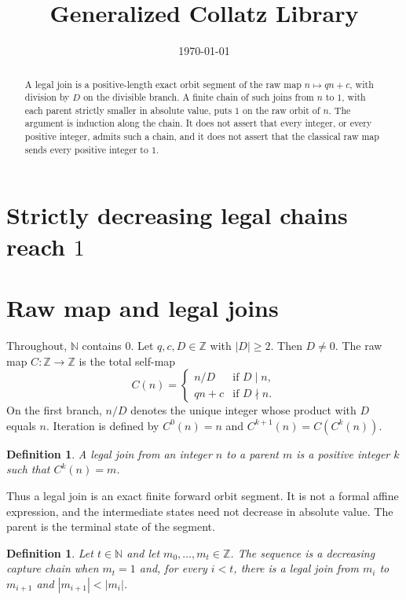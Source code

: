 \documentclass[11pt,letterpaper]{article}
\title{Generalized Collatz Library}
\author{}
\date{\today}
\newcommand{\N}{\mathbb{N}}
\newcommand{\Z}{\mathbb{Z}}
\newcommand{\Map}[3]{#1 \colon #2 \to #3}
\newtheorem{definition}[theorem]{Definition}
\begin{document}
\maketitle
\section*{Strictly decreasing legal chains reach \(1\)}

\begin{abstract}
A legal join is a positive-length exact orbit segment of the raw map \(n\mapsto qn+c\), with division by \(D\) on the divisible branch. A finite chain of such joins from \(n\) to \(1\), with each parent strictly smaller in absolute value, puts \(1\) on the raw orbit of \(n\). The argument is induction along the chain. It does not assert that every integer, or every positive integer, admits such a chain, and it does not assert that the classical raw map sends every positive integer to \(1\).
\end{abstract}

\section{Raw map and legal joins}

Throughout, \(\N\) contains \(0\). Let \(q,c,D\in\Z\) with \(|D|\ge 2\). Then \(D\neq 0\). The raw map \(\Map{C}{\Z}{\Z}\) is the total self-map
\begin{equation}
\label{eq:raw}
C(n)=
\begin{cases}
n/D & \text{if }D\mid n,\\
qn+c & \text{if }D\nmid n.
\end{cases}
\end{equation}
On the first branch, \(n/D\) denotes the unique integer whose product with \(D\) equals \(n\). Iteration is defined by \(C^{0}(n)=n\) and \(C^{k+1}(n)=C(C^{k}(n))\).

\begin{definition}
\label{def:join}
A \emph{legal join} from an integer \(n\) to a parent \(m\) is a positive integer \(k\) such that \(C^{k}(n)=m\).
\end{definition}

Thus a legal join is an exact finite forward orbit segment. It is not a formal affine expression, and the intermediate states need not decrease in absolute value. The parent is the terminal state of the segment.

\begin{definition}
\label{def:chain}
Let \(t\in\N\) and let \(m_0,\ldots,m_t\in\Z\). The sequence is a \emph{decreasing capture chain} when \(m_t=1\) and, for every \(i<t\), there is a legal join from \(m_i\) to \(m_{i+1}\) and \(|m_{i+1}|<|m_i|\).
\end{definition}
\end{document}

